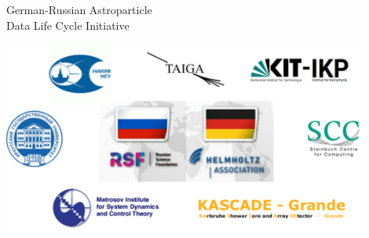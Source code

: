 \begin{frame}{German-Russian Astroparticle \\Data Life Cycle Initiative\footnotemark[1]}
\vspace{-1.4em}
\begin{center}
  \includegraphics[width=0.9\textwidth]{pics/Collab-1.pdf}
\end{center}

\footnotesize{}
\end{frame}

